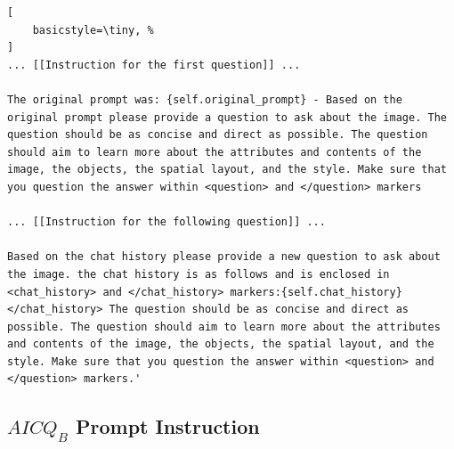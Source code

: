 \begin{lstlisting}[
    basicstyle=\tiny, %
]
... [[Instruction for the first question]] ...

The original prompt was: {self.original_prompt} - Based on the original prompt please provide a question to ask about the image. The question should be as concise and direct as possible. The question should aim to learn more about the attributes and contents of the image, the objects, the spatial layout, and the style. Make sure that you question the answer within <question> and </question> markers

... [[Instruction for the following question]] ...

Based on the chat history please provide a new question to ask about the image. the chat history is as follows and is enclosed in  <chat_history> and </chat_history> markers:{self.chat_history} </chat_history> The question should be as concise and direct as possible. The question should aim to learn more about the attributes and contents of the image, the objects, the spatial layout, and the style. Make sure that you question the answer within <question> and </question> markers.'
\end{lstlisting}

\subsection{$AICQ_{B}$ Prompt Instruction} \label{ssec:belief_agent_prompt}

